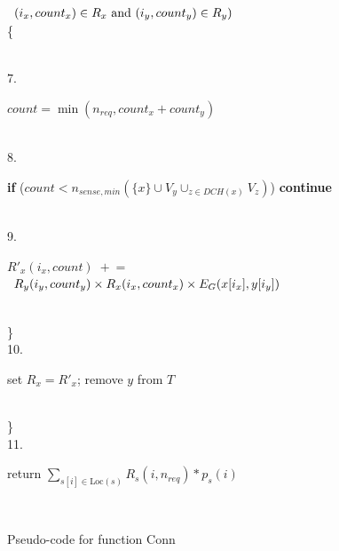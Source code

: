 \documentclass{beamer}
\newcommand{\loc}   	{ {\mathrm {Loc}} }
\newcommand{\fConn}   	{ {\mathrm {Conn}} }
\newcommand{\nReq}    { {n_{req}} }
\newcommand{\DCH}     { {DCH} }
\newcommand{\plusEqual}   { {\;{\scriptstyle +} \! =} }
\newcommand{\iin}[1]    {\hspace*{#1in}}
\begin{document}
\begin{frame}
\begin{figure}[htbp]
\begin{center}
\begin{minipage}[t]{5 in}
\begin{minipage}[t]{5in}
		       		$\begin{array}[t]{l}
				 (i_x, count_x) \in R_x \mbox { and }
		   		 (i_y, count_y) \in R_y)
				 \end{array}
				$ \\ 
		  \{
		  \end{minipage}
		  \\
   7.  \iin{0.40} \begin{minipage}[t]{5 in}
   		  $count= \min (\nReq, count_x + count_y)$
		  \end{minipage}
		  \\
  8.  \iin{0.40} \begin{minipage}[t]{5 in}
   		  {\bf if} ($count < n_{sense,min}(\{x\}\cup V_y \cup_{z\in DCH(x)} V_z)$) {\bf continue} 
		  \end{minipage}
		  \\
   9.  \iin{0.35} \begin{minipage}[t]{5in}
   		  $R'_x (i_x,count) \plusEqual$ 
		  	$\begin{array}[t]{l}
			 R_y(i_y,count_y) \times 
			 R_x(i_x,count_x) \times 
			 E_G(x[i_x], y[i_y])
		  	 \end{array}$
		  \end{minipage}
		  \\
       \iin{0.40} \} \\
   10. \iin{0.20} \begin{minipage}[t]{5 in}
       		  set $R_x= R'_x$; remove $y$ from $T$
		   \end{minipage}
		   \\
       \iin{0.15} \} \\
   11. \begin{minipage}[t]{6 in}
       return $\sum_{s[i] \in \loc(s)} R_s(i,\nReq) * p_s(i)$
       \end{minipage}
       \\
    \end{minipage}	
\end{center}
    \normalsize
    \caption{Pseudo-code for function $\fConn$}
    \label{alg:Conn}
\vspace*{-0.1in}
    \end{figure}

\end{frame}
\end{document}
